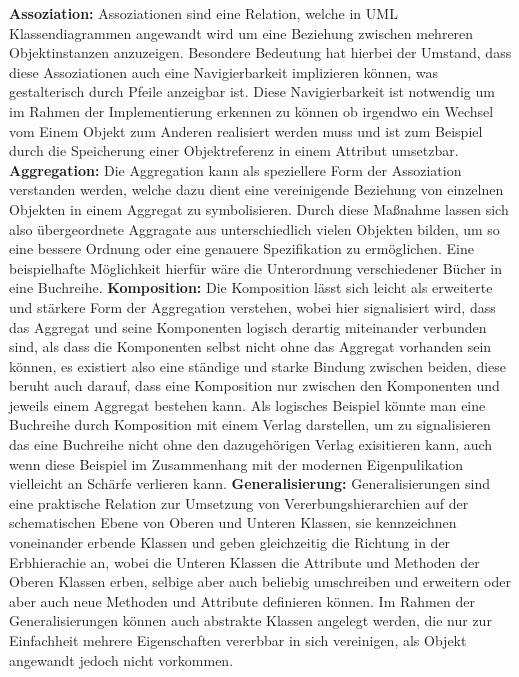 \documentclass{swp1}
\begin{document}
\textbf{Assoziation:}\newline
Assoziationen sind eine Relation, welche in UML Klassendiagrammen angewandt wird um eine Beziehung zwischen mehreren Objektinstanzen anzuzeigen.
Besondere Bedeutung hat hierbei der Umstand, dass diese Assoziationen auch eine Navigierbarkeit implizieren können, was gestalterisch durch Pfeile anzeigbar ist.\newline
Diese Navigierbarkeit ist notwendig um im Rahmen der Implementierung erkennen zu können ob irgendwo ein Wechsel vom Einem Objekt zum Anderen realisiert werden muss und ist zum Beispiel durch die Speicherung einer Objektreferenz in einem Attribut umsetzbar.\newline
\textbf{Aggregation:}\newline
Die Aggregation kann als speziellere Form der Assoziation verstanden werden, welche dazu dient eine vereinigende Beziehung von einzelnen Objekten in einem Aggregat zu symbolisieren.
Durch diese Maßnahme lassen sich also übergeordnete Aggragate aus unterschiedlich vielen Objekten bilden, um so eine bessere Ordnung oder eine genauere Spezifikation zu ermöglichen.\newline
Eine beispielhafte Möglichkeit hierfür wäre die Unterordnung verschiedener Bücher in eine Buchreihe.\newline
\textbf{Komposition:}\newline
Die Komposition lässt sich leicht als erweiterte und stärkere Form der Aggregation verstehen, wobei hier signalisiert wird, dass das Aggregat und seine Komponenten logisch derartig miteinander verbunden sind, als dass die Komponenten selbst nicht ohne das Aggregat vorhanden sein können, es existiert also eine ständige und starke Bindung zwischen beiden, diese beruht auch darauf, dass eine Komposition nur zwischen den Komponenten und jeweils einem Aggregat bestehen kann.\newline
Als logisches Beispiel könnte man eine Buchreihe durch Komposition mit einem Verlag darstellen, um zu signalisieren das eine Buchreihe nicht ohne den dazugehörigen Verlag exisitieren kann, auch wenn diese Beispiel im Zusammenhang mit der modernen Eigenpulikation vielleicht an Schärfe verlieren kann.\newline
\textbf{Generalisierung:}\newline
Generalisierungen sind eine praktische Relation zur Umsetzung von Vererbungshierarchien auf der schematischen Ebene von Oberen und Unteren Klassen, sie kennzeichnen voneinander erbende Klassen und geben gleichzeitig die Richtung in der Erbhierachie an, wobei die Unteren Klassen die Attribute und Methoden der Oberen Klassen erben, selbige aber auch beliebig umschreiben und erweitern oder aber auch neue Methoden und Attribute definieren können. Im Rahmen der Generalisierungen können auch abstrakte Klassen angelegt werden, die nur zur Einfachheit mehrere Eigenschaften vererbbar in sich vereinigen, als Objekt angewandt jedoch nicht vorkommen.\newline
\end{document}
